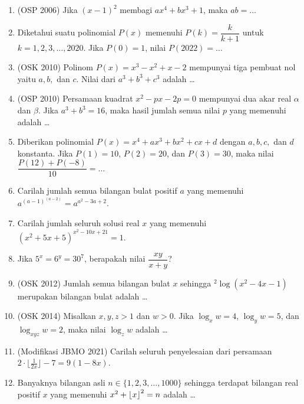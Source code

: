 \documentclass[11pt]{scrartcl}
\begin{document}
\begin{enumerate}
    \item (OSP 2006) Jika $(x-1)^2$ membagi $ax^4+bx^3+1$, maka $ab=\dots$
    
    \item Diketahui suatu polinomial $P(x)$ memenuhi $P(k)=\dfrac{k}{k+1}$ untuk $k=1,2,3,\dots,2020$. Jika $P(0)=1$, nilai $P(2022)=\dots$
    
    \item (OSK 2010) Polinom $P(x)=x^3-x^2+x-2$ mempunyai tiga pembuat nol yaitu $a,b,$ dan $c$. Nilai dari $a^3+b^3+c^3$ adalah \dots
    
    \item (OSP 2010) Persamaan kuadrat $x^2-px-2p=0$ mempunyai dua akar real $\alpha$ dan $\beta$. Jika $a^3+b^3=16$, maka hasil jumlah semua nilai $p$ yang memenuhi adalah \dots 
    
    \item Diberikan polinomial $P(x)=x^4+ax^3+bx^2+cx+d$ dengan $a,b,c,$ dan $d$ konstanta. Jika $P(1)=10$, $P(2)=20$, dan  $P(3)=30$, maka nilai
    $\dfrac{P(12)+P(-8)}{10}=\dots$
    
    \item Carilah jumlah semua bilangan bulat positif $a$ yang memenuhi $a^{(a-1)^{(a-2)}}=a^{a^2-3a+2}$.
        
        \item Carilah jumlah seluruh solusi real $x$ yang memenuhi $(x^2+5x+5)^{x^2-10x+21}=1.$
        
        \item Jika $5^x=6^y=30^7$, berapakah nilai $\dfrac{xy}{x+y}$?
        
        \item (OSK 2012) Jumlah semua bilangan bulat $x$ sehingga $^2 \log (x^2-4x-1)$ merupakan bilangan bulat adalah \dots
        
        \item (OSK 2014) Misalkan $x,y,z>1$ dan $w>0$. Jika $\log_x w = 4$, $\log_y w = 5$, dan $\log_{xyz} w = 2$, maka nilai $\log_z w$ adalah \dots 
        
        \item (Modifikasi JBMO 2021) Carilah seluruh penyelesaian dari persamaan $2\cdot \lfloor{\frac{1}{2x}}\rfloor - 7 = 9(1 - 8x)$.
        
        \item Banyaknya bilangan asli $n \in \{1,2,3,\dots,1000\}$ sehingga terdapat bilangan real positif $x$ yang memenuhi $x^2+\left\lfloor x \right\rfloor^2=n$ adalah \dots
        

\end{enumerate}
\end{document}
